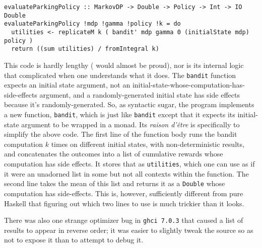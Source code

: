 \documentclass[paper=letter,pagesize=automedia,twoside=false,12pt]{scrartcl}
\DeclareRobustCommand{\abbrev}[1]{{\addfontfeature{Letters=UppercaseSmallCaps}{#1}}}
\theoremstyle{plain}%
\theoremstyle{definition}
\theoremstyle{remark}
\providecommand{\abbrev}[1]{{\scshape {#1}}}
\begin{document}
\begin{verbatim}
evaluateParkingPolicy :: MarkovDP -> Double -> Policy -> Int -> IO Double
evaluateParkingPolicy !mdp !gamma !policy !k = do
  utilities <- replicateM k ( bandit' mdp gamma 0 (initialState mdp) policy )
  return ((sum utilities) / fromIntegral k)
\end{verbatim}

This code is hardly lengthy (\abbrev{APL} would almost be proud), nor is its internal logic that complicated when one understands what it does.  The \texttt{bandit} function expects an initial state argument, not an initial-state-whose-computation-has-side-effects argument, and a randomly-generated initial state has side effects because it’s randomly-generated.  So, as syntactic sugar, the program implements a new function, \texttt{bandit\textsuperscript\prime}, which is just like \texttt{bandit} except that it expects its initial-state argument to be wrapped in a monad.  Its \emph{raison d’être} is specifically to simplify the above code.  The first line of the function body runs the bandit computation \(k\) times on different initial states, with non-deterministic results, and concatenates the outcomes into a list of cumulative rewards whose computation has side effects.  It stores that as \texttt{utilities}, which one can use as if it were an unadorned list in some but not all contexts within the function.  The second line takes the mean of this list and returns it as a \texttt{Double} whose computation has side-effects.  This is, however, sufficiently different from pure Haskell that figuring out which two lines to use is much trickier than it looks.

There was also one strange optimizer bug in \texttt{ghci 7.0.3} that caused a list of results to appear in reverse order; it was easier to slightly tweak the source so as not to expose it than to attempt to debug it.
\end{document}
